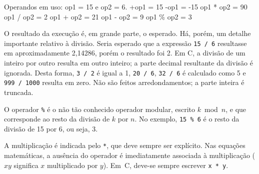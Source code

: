 \documentclass[
  11pt,
  a4paper,
]{scrbook}
\newenvironment{Shaded}{\begin{snugshade}}{\end{snugshade}}
\newcommand{\NormalTok}[1]{#1}
\begin{document}
\begin{Shaded}
\begin{Highlighting}[]
\NormalTok{Operandos em uso: op1 = 15 e op2 = 6.}
\NormalTok{+op1 = 15}
\NormalTok{{-}op1 = {-}15}
\NormalTok{op1 * op2 = 90}
\NormalTok{op1 / op2 = 2}
\NormalTok{op1 + op2 = 21}
\NormalTok{op1 {-} op2 = 9}
\NormalTok{op1 \% op2 = 3}
\end{Highlighting}
\end{Shaded}

O resultado da execução é, em grande parte, o esperado. Há, porém, um
detalhe importante relativo à divisão. Seria esperado que a expressão
\texttt{15\ /\ 6} resultasse em aproximadamente 2,14286, porém o
resultado foi 2. Em C, a divisão de um inteiro por outro resulta em
outro inteiro; a parte decimal resultante da divisão é ignorada. Desta
forma, \texttt{3\ /\ 2} é igual a 1, \texttt{20\ /\ 6},
\texttt{32\ /\ 6} é calculado como 5 e \texttt{999\ /\ 1000} resulta em
zero. Não são feitos arredondamentos; a parte inteira é truncada.

O operador \texttt{\%} é o não tão conhecido operador modular, escrito
\(k\)~mod~\(n\), e que corresponde ao resto da divisão de \(k\) por
\(n\). No exemplo, \texttt{15\ \%\ 6} é o resto da divisão de 15 por 6,
ou seja, 3.

A multiplicação é indicada pelo \texttt{*}, que deve sempre ser
explícito. Nas equações matemáticas, a ausência do operador é
imediatamente associada à multiplicação (\(xy\) significa \(x\)
multiplicado por \(y\)). Em~C, deve-se sempre escrever \texttt{x\ *\ y}.
\end{document}
